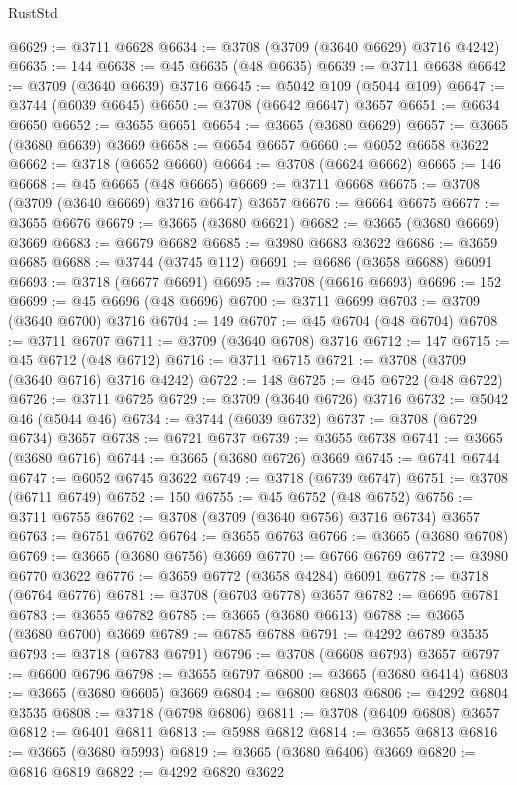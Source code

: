 \begin{lexlean}{RustStd}
\begin{coremodule}
@6629 := @3711 @6628
@6634 := @3708 (@3709 (@3640 @6629) @3716 @4242)
@6635 := 144
@6638 := @45 @6635 (@48 @6635)
@6639 := @3711 @6638
@6642 := @3709 (@3640 @6639) @3716
@6645 := @5042 @109 (@5044 @109)
@6647 := @3744 (@6039 @6645)
@6650 := @3708 (@6642 @6647) @3657
@6651 := @6634 @6650
@6652 := @3655 @6651
@6654 := @3665 (@3680 @6629)
@6657 := @3665 (@3680 @6639) @3669
@6658 := @6654 @6657
@6660 := @6052 @6658 @3622
@6662 := @3718 (@6652 @6660)
@6664 := @3708 (@6624 @6662)
@6665 := 146
@6668 := @45 @6665 (@48 @6665)
@6669 := @3711 @6668
@6675 := @3708 (@3709 (@3640 @6669) @3716 @6647) @3657
@6676 := @6664 @6675
@6677 := @3655 @6676
@6679 := @3665 (@3680 @6621)
@6682 := @3665 (@3680 @6669) @3669
@6683 := @6679 @6682
@6685 := @3980 @6683 @3622
@6686 := @3659 @6685
@6688 := @3744 (@3745 @112)
@6691 := @6686 (@3658 @6688) @6091
@6693 := @3718 (@6677 @6691)
@6695 := @3708 (@6616 @6693)
@6696 := 152
@6699 := @45 @6696 (@48 @6696)
@6700 := @3711 @6699
@6703 := @3709 (@3640 @6700) @3716
@6704 := 149
@6707 := @45 @6704 (@48 @6704)
@6708 := @3711 @6707
@6711 := @3709 (@3640 @6708) @3716
@6712 := 147
@6715 := @45 @6712 (@48 @6712)
@6716 := @3711 @6715
@6721 := @3708 (@3709 (@3640 @6716) @3716 @4242)
@6722 := 148
@6725 := @45 @6722 (@48 @6722)
@6726 := @3711 @6725
@6729 := @3709 (@3640 @6726) @3716
@6732 := @5042 @46 (@5044 @46)
@6734 := @3744 (@6039 @6732)
@6737 := @3708 (@6729 @6734) @3657
@6738 := @6721 @6737
@6739 := @3655 @6738
@6741 := @3665 (@3680 @6716)
@6744 := @3665 (@3680 @6726) @3669
@6745 := @6741 @6744
@6747 := @6052 @6745 @3622
@6749 := @3718 (@6739 @6747)
@6751 := @3708 (@6711 @6749)
@6752 := 150
@6755 := @45 @6752 (@48 @6752)
@6756 := @3711 @6755
@6762 := @3708 (@3709 (@3640 @6756) @3716 @6734) @3657
@6763 := @6751 @6762
@6764 := @3655 @6763
@6766 := @3665 (@3680 @6708)
@6769 := @3665 (@3680 @6756) @3669
@6770 := @6766 @6769
@6772 := @3980 @6770 @3622
@6776 := @3659 @6772 (@3658 @4284) @6091
@6778 := @3718 (@6764 @6776)
@6781 := @3708 (@6703 @6778) @3657
@6782 := @6695 @6781
@6783 := @3655 @6782
@6785 := @3665 (@3680 @6613)
@6788 := @3665 (@3680 @6700) @3669
@6789 := @6785 @6788
@6791 := @4292 @6789 @3535
@6793 := @3718 (@6783 @6791)
@6796 := @3708 (@6608 @6793) @3657
@6797 := @6600 @6796
@6798 := @3655 @6797
@6800 := @3665 (@3680 @6414)
@6803 := @3665 (@3680 @6605) @3669
@6804 := @6800 @6803
@6806 := @4292 @6804 @3535
@6808 := @3718 (@6798 @6806)
@6811 := @3708 (@6409 @6808) @3657
@6812 := @6401 @6811
@6813 := @5988 @6812
@6814 := @3655 @6813
@6816 := @3665 (@3680 @5993)
@6819 := @3665 (@3680 @6406) @3669
@6820 := @6816 @6819
@6822 := @4292 @6820 @3622

\end{coremodule}
\end{lexlean}
